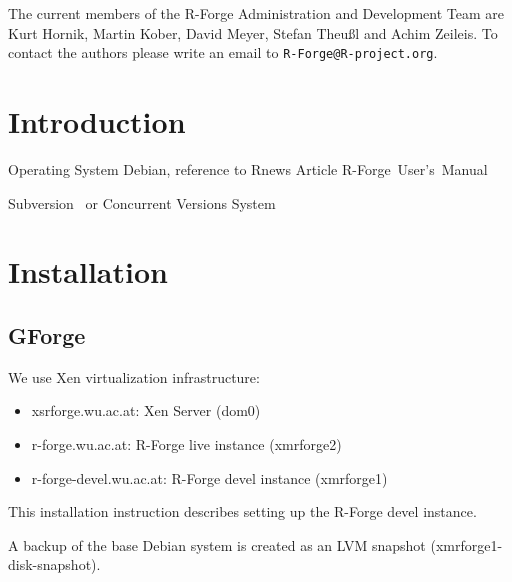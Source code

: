 \documentclass[a4paper]{article}
\newcommand{\RFORGE}{R-Forge Administration and Development Team}
\let\email=\texttt
\begin{document}
\vspace{0.5cm}
The current members of the \RFORGE{} are Kurt Hornik, Martin Kober,
David Meyer, Stefan Theu\ss{}l and Achim Zeileis. To contact the
authors please write an email to \email{R-Forge@R-project.org}.

\newpage

\pagestyle{plain}
\tableofcontents

\clearpage
\pagestyle{headings}
\setcounter{page}{1}

\section{Introduction}

Operating System Debian, reference to Rnews Article
R-Forge~User's~Manual

Subversion~\citep[SVN,
see][]{forge:Pilato+Collins-Sussman+Fitzpatrick:2004} or Concurrent
Versions System~\citep[CVS, see][]{forge:Cederqvist:2006}


\newpage

\section{Installation}
\label{sec:installation}

\subsection{GForge}

\vspace{0.5cm}
We use Xen virtualization infrastructure:

\begin{itemize}
	\item xsrforge.wu.ac.at: Xen Server (dom0)
	\item r-forge.wu.ac.at: R-Forge live instance (xmrforge2)
	\item r-forge-devel.wu.ac.at: R-Forge devel instance (xmrforge1)
\end{itemize}

This installation instruction describes setting up the R-Forge devel instance.

A backup of the base Debian system is created as an 
LVM snapshot (xmrforge1-disk-snapshot).
\end{document}
